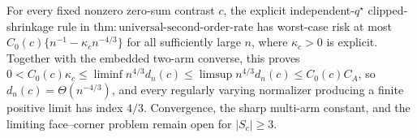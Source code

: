 For every fixed nonzero zero-sum contrast \(c\), the explicit independent-\(q^\star\) clipped-shrinkage rule in \(\mathrm{thm:universal\text{-}second\text{-}order\text{-}rate}\) has worst-case risk at most \(C_0(c)\{n^{-1}-\kappa_cn^{-4/3}\}\) for all sufficiently large \(n\), where \(\kappa_c>0\) is explicit. Together with the embedded two-arm converse, this proves \(0<C_0(c)\kappa_c\leq\liminf n^{4/3}d_n(c)\leq\limsup n^{4/3}d_n(c)\leq C_0(c)C_A\), so \(d_n(c)=\Theta(n^{-4/3})\), and every regularly varying normalizer producing a finite positive limit has index \(4/3\). Convergence, the sharp multi-arm constant, and the limiting face--corner problem remain open for \(|S_c|\geq3\).